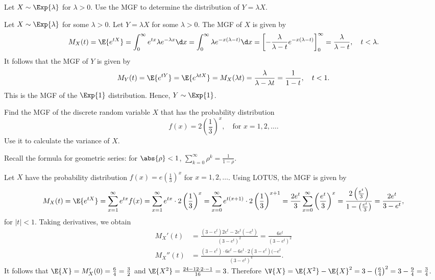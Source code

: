 	\begin{exercise}\label{ex:chap06:02}
		Let $X \sim \Exp{\lambda}$ for $\lambda > 0$. Use the MGF to determine the distribution of $Y = \lambda X$.
		\begin{solution}
			Let $X \sim \Exp{\lambda}$ for some $\lambda > 0$. Let $Y = \lambda X$ for some $\lambda > 0$. The MGF of $X$ is given by
			\begin{align*}
				M_X(t) = \E{e^{tX}} = \int_0^{\infty} e^{tx} \lambda e^{-\lambda x} \d x = \int_0^{\infty} \lambda e^{-x(\lambda - t)} \d x = \left[- \frac{\lambda}{\lambda - t} e^{-x(\lambda - t)}\right]_0^{\infty} = \frac{\lambda}{\lambda - t}, \quad t < \lambda.
			\end{align*}
			It follows that the MGF of $Y$ is given by
			\begin{align*}
				M_Y(t) = \E{e^{tY}} = \E{e^{\lambda t X}} = M_X(\lambda t) =  \frac{\lambda}{\lambda - \lambda t} = \frac{1}{1 - t}, \quad t < 1.
			\end{align*}
			This is the MGF of the $\Exp{1}$ distribution. Hence, $Y \sim \Exp{1}$.
		\end{solution}
	\end{exercise}
	
	\begin{exercise}\label{ex:chap06:003}
		Find the MGF of the discrete random variable $X$ that has the probability distribution
		\begin{equation}
			f(x) = 2 \left(\frac{1}{3}\right)^x, \quad \text{for } x = 1, 2, \ldots.
		\end{equation}
		Use it to calculate the variance of $X$.
		\begin{hint}
			Recall the formula for geometric series: for $\abs{\rho} < 1$, $\sum_{k = 0}^{\infty} \rho^k = \frac{1}{1 - \rho}$.
		\end{hint}
		\begin{solution}
			Let $X$ have the probability distribution $f(x) = e \left(\frac{1}{3}\right)^x$ for $x = 1, 2, \ldots$. Using LOTUS, the MGF is given by
		\begin{align*}
			M_X(t) = \E{e^{tX}} = \sum_{x=1}^{\infty} e^{tx} f(x) = \sum_{x=1}^{\infty} e^{tx} \cdot 2 \left(\frac{1}{3}\right)^x = \sum_{x=0}^{\infty} e^{t(x+1)} \cdot 2 \left(\frac{1}{3}\right)^{x+1} = \frac{2 e^t}{3} \sum_{x=0}^{\infty} \left(\frac{e^t}{3}\right)^x = \frac{2 \left(\frac{e^t}{3}\right)}{1 - \left(\frac{e^t}{3}\right)} = \frac{2e^t}{3 - e^t},
		\end{align*}
		for $|t|<1$. Taking derivatives, we obtain
		\begin{align*}
			M_X'(t) & = \frac{(3 - e^t) 2e^t - 2e^t (-e^t)}{(3 - e^t)^2} = \frac{6e^t}{(3 - e^t)^2} \\
			M_X''(t) & = \frac{(3 - e^t) \cdot 6e^t - 6e^t \cdot 2(3 - e^t)(-e^t}{(3 - e^t)^4}.
		\end{align*}
		It follows that $\E{X} = M_X'(0) = \frac{6}{4} = \frac{3}{2}$ and $\E{X^2} = \frac{24 - 12 \cdot 2 \cdot -1}{16} = 3$. Therefore $\V{X} = \E{X^2} - \E{X}^2 = 3 - \left(\frac{6}{4}\right)^2 = 3 - \frac{9}{4} = \frac{3}{4}$.
		\end{solution}
	\end{exercise}
	
